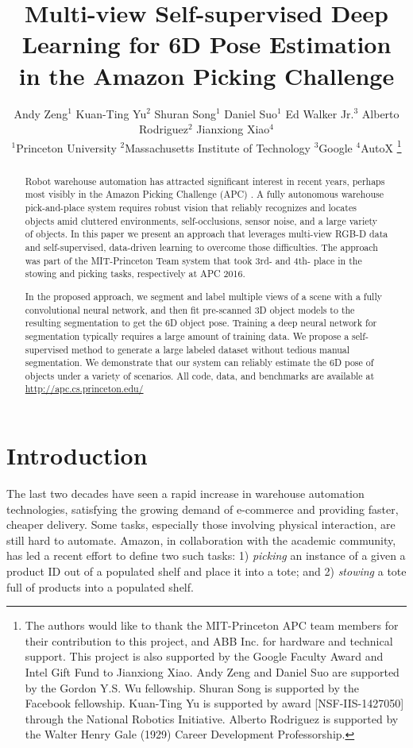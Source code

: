 \documentclass[letterpaper, 10 pt, conference]{ieeeconf}  %
\title{\LARGE \bf
Multi-view Self-supervised Deep Learning for 6D Pose Estimation \\in the Amazon Picking Challenge}
\author{Andy Zeng$^{1}$  Kuan-Ting Yu$^{2}$  Shuran Song$^{1}$  Daniel Suo$^{1}$  Ed Walker Jr.$^{3}$ Alberto Rodriguez$^{2}$  Jianxiong Xiao$^{4}$
\vspace{0.1cm} \\ 
$^{1}$Princeton University\quad\quad
$^{2}$Massachusetts Institute of Technology\quad\quad
$^{3}$Google\quad\quad
$^{4}$AutoX
\thanks{The authors would like to thank the MIT-Princeton APC team members for their contribution to this project, and ABB Inc. for hardware and technical support. This project is also supported by the Google Faculty Award and Intel Gift Fund to Jianxiong Xiao. Andy Zeng and Daniel Suo are supported by the Gordon Y.S. Wu fellowship. Shuran Song is supported by the Facebook fellowship. Kuan-Ting Yu is supported by award [NSF-IIS-1427050] through the National Robotics Initiative. Alberto Rodriguez is supported by the Walter Henry Gale (1929) Career Development Professorship.}
}
\begin{document}
\maketitle
\thispagestyle{empty}
\pagestyle{empty}


\begin{abstract}

Robot warehouse automation has attracted significant interest in recent years, perhaps most visibly in the Amazon Picking Challenge (APC) \cite{apcwebsite}. 
%
A fully autonomous warehouse pick-and-place system requires robust vision that reliably recognizes and locates objects amid cluttered environments, self-occlusions, sensor noise, and a large variety of objects.
%
In this paper we present an approach that leverages multi-view RGB-D data and self-supervised, data-driven learning to overcome those difficulties.
%
The approach was part of the MIT-Princeton Team system that took 3rd- and 4th- place in the stowing and picking tasks, respectively at APC 2016.


In the proposed approach, we segment and label multiple views of a scene with a fully convolutional neural network, and then fit pre-scanned 3D object models to the resulting segmentation to get the 6D object pose.
%
Training a deep neural network for segmentation typically requires a large amount of training data.
%
We propose a self-supervised method to generate a large labeled dataset without tedious manual segmentation.
%
We demonstrate that our system can reliably estimate the 6D pose of objects under a variety of scenarios. All code, data, and benchmarks are available at \href{http://apc.cs.princeton.edu/}{http://apc.cs.princeton.edu/}

\end{abstract}



\section{Introduction}
%
The last two decades have seen a rapid increase in warehouse automation technologies, satisfying the growing demand of e-commerce and providing faster, cheaper delivery. Some tasks, especially those involving physical interaction, are still hard to automate. Amazon, in collaboration with the academic community, has led a recent effort to define two such tasks: 
%
1) \emph{picking} an instance of a given a product ID out of a populated shelf and place it into a tote; 
%
and 2) \emph{stowing} a tote full of products into a populated shelf.
\end{document}
